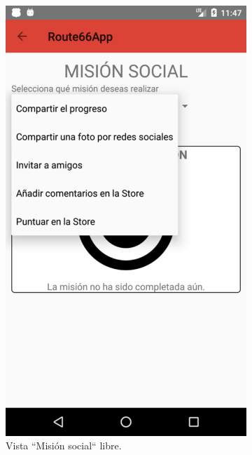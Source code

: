 \documentclass[twoside]{report}
\begin{document}
\begin{figure}[H]
\begin{center}
	\begin{subfigure}[t]{.3\linewidth}
		\includegraphics[scale=0.25]{images/userguide/26.png}
		\caption{Vista “Misión social“ libre.}
	\end{subfigure}\hspace{2mm}%
	\begin{subfigure}[t]{.3\linewidth}

\end{subfigure}
\end{center}
\end{figure}
\end{document}
